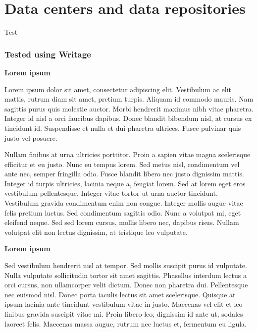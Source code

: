 \documentclass[
]{book}
\begin{document}
\hypertarget{data-centers-and-data-repositories}{%
\chapter{Data centers and data repositories}\label{data-centers-and-data-repositories}}

Test

\hypertarget{tested-using-writage}{%
\subsection{Tested using Writage}\label{tested-using-writage}}

\textbf{Lorem ipsum}

Lorem ipsum dolor sit amet, consectetur adipiscing elit. Vestibulum ac elit mattis, rutrum diam sit amet, pretium turpis. Aliquam id commodo mauris. Nam sagittis purus quis molestie auctor. Morbi hendrerit maximus nibh vitae pharetra. Integer id nisl a orci faucibus dapibus. Donec blandit bibendum nisl, at cursus ex tincidunt id. Suspendisse et nulla et dui pharetra ultrices. Fusce pulvinar quis justo vel posuere.

Nullam finibus at urna ultricies porttitor. Proin a sapien vitae magna scelerisque efficitur et eu justo. Nunc eu tempus lorem. Sed metus nisl, condimentum vel ante nec, semper fringilla odio. Fusce blandit libero nec justo dignissim mattis. Integer id turpis ultricies, lacinia neque a, feugiat lorem. Sed at lorem eget eros vestibulum pellentesque. Integer vitae tortor ut urna auctor tincidunt. Vestibulum gravida condimentum enim non congue. Integer mollis augue vitae felis pretium luctus. Sed condimentum sagittis odio. Nunc a volutpat mi, eget eleifend neque. Sed sed lorem cursus, mollis libero nec, dapibus risus. Nullam volutpat elit non lectus dignissim, at tristique leo vulputate.

\textbf{Lorem ipsum}

Sed vestibulum hendrerit nisl at tempor. Sed mollis suscipit purus id vulputate. Nulla vulputate sollicitudin tortor sit amet sagittis. Phasellus interdum lectus a orci cursus, non ullamcorper velit dictum. Donec non pharetra dui. Pellentesque nec euismod nisl. Donec porta iaculis lectus sit amet scelerisque. Quisque at ipsum lacinia ante tincidunt vestibulum vitae in justo. Maecenas vel elit et leo finibus gravida suscipit vitae mi. Proin libero leo, dignissim id ante ut, sodales laoreet felis. Maecenas massa augue, rutrum nec luctus et, fermentum eu ligula.
\end{document}
